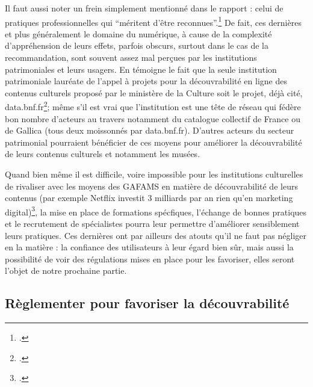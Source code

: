 Il faut aussi noter un frein simplement mentionné dans le rapport : celui de pratiques professionnelles qui \enquote{méritent d’être reconnues}.\footcite[p. 21]{ministeresdelaculturefranceetquebec2020} De fait, ces dernières et plus généralement le domaine du numérique, à cause de la complexité d’appréhension de leurs effets, parfois obscurs, surtout dans le cas de la recommandation, sont souvent assez mal perçues par les institutions patrimoniales et leurs usagers. En témoigne le fait que la seule institution patrimoniale lauréate de l’appel à projets pour la découvrabilité en ligne des contenus culturels proposé par le ministère de la Culture soit le projet, déjà cité, data.bnf.fr\footcite{noauthor_decouvrabilite_2024}; même s’il est vrai que l’institution est une tête de réseau qui fédère bon nombre d’acteurs au travers notamment du catalogue collectif de France ou de Gallica (tous deux moissonnés par data.bnf.fr). D’autres acteurs du secteur patrimonial pourraient bénéficier de ces moyens pour améliorer la découvrabilité de leurs contenus culturels et notamment les musées.  

Quand bien même il est difficile, voire impossible pour les institutions culturelles de rivaliser avec les moyens des GAFAMS en matière de découvrabilité de leurs contenus (par exemple Netflix investit 3 milliards par an rien qu’en marketing digital)\footcite[p. 23]{ministeresdelaculturefranceetquebec2020}, la mise en place de formations spécfiques, l'échange de bonnes pratiques et le recrutement de spécialistes pourra leur permettre d'améliorer sensiblement leurs pratiques. Ces dernières ont par ailleurs des atouts qu’il ne faut pas négliger en la matière : la confiance des utilisateurs à leur égard bien sûr, mais aussi la possibilité de voir des régulations mises en place pour les favoriser, elles seront l’objet de notre prochaine partie.


\subsection{Règlementer pour favoriser la découvrabilité}

